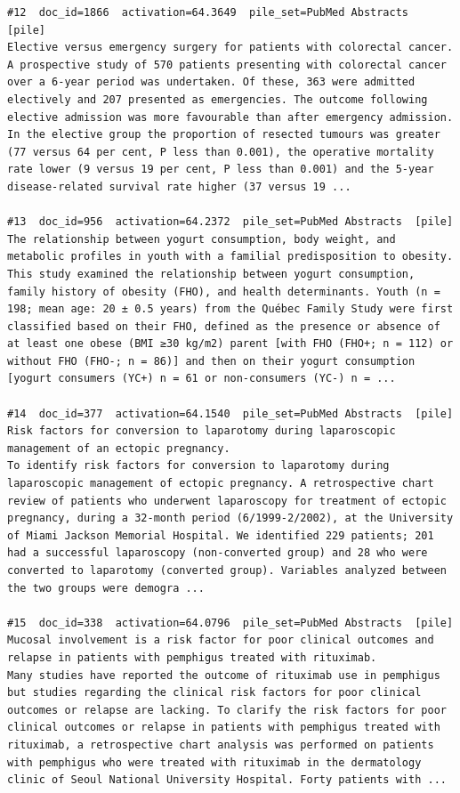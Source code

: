 \begin{verbatim}
#12  doc_id=1866  activation=64.3649  pile_set=PubMed Abstracts  [pile]
Elective versus emergency surgery for patients with colorectal cancer.
A prospective study of 570 patients presenting with colorectal cancer over a 6-year period was undertaken. Of these, 363 were admitted electively and 207 presented as emergencies. The outcome following elective admission was more favourable than after emergency admission. In the elective group the proportion of resected tumours was greater (77 versus 64 per cent, P less than 0.001), the operative mortality rate lower (9 versus 19 per cent, P less than 0.001) and the 5-year disease-related survival rate higher (37 versus 19 ...

#13  doc_id=956  activation=64.2372  pile_set=PubMed Abstracts  [pile]
The relationship between yogurt consumption, body weight, and metabolic profiles in youth with a familial predisposition to obesity.
This study examined the relationship between yogurt consumption, family history of obesity (FHO), and health determinants. Youth (n = 198; mean age: 20 ± 0.5 years) from the Québec Family Study were first classified based on their FHO, defined as the presence or absence of at least one obese (BMI ≥30 kg/m2) parent [with FHO (FHO+; n = 112) or without FHO (FHO-; n = 86)] and then on their yogurt consumption [yogurt consumers (YC+) n = 61 or non-consumers (YC-) n = ...

#14  doc_id=377  activation=64.1540  pile_set=PubMed Abstracts  [pile]
Risk factors for conversion to laparotomy during laparoscopic management of an ectopic pregnancy.
To identify risk factors for conversion to laparotomy during laparoscopic management of ectopic pregnancy. A retrospective chart review of patients who underwent laparoscopy for treatment of ectopic pregnancy, during a 32-month period (6/1999-2/2002), at the University of Miami Jackson Memorial Hospital. We identified 229 patients; 201 had a successful laparoscopy (non-converted group) and 28 who were converted to laparotomy (converted group). Variables analyzed between the two groups were demogra ...

#15  doc_id=338  activation=64.0796  pile_set=PubMed Abstracts  [pile]
Mucosal involvement is a risk factor for poor clinical outcomes and relapse in patients with pemphigus treated with rituximab.
Many studies have reported the outcome of rituximab use in pemphigus but studies regarding the clinical risk factors for poor clinical outcomes or relapse are lacking. To clarify the risk factors for poor clinical outcomes or relapse in patients with pemphigus treated with rituximab, a retrospective chart analysis was performed on patients with pemphigus who were treated with rituximab in the dermatology clinic of Seoul National University Hospital. Forty patients with ...


\end{verbatim}
